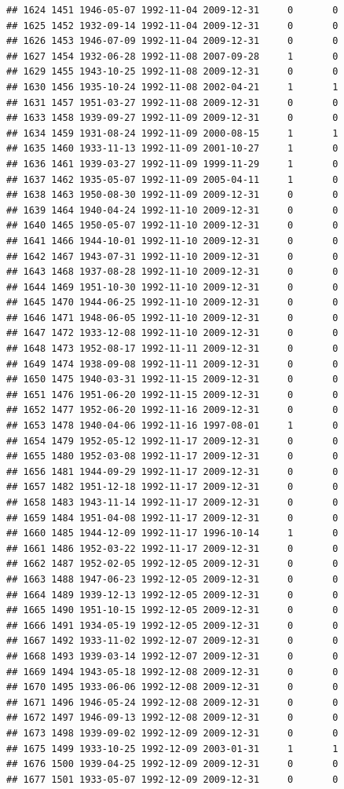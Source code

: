 \documentclass[
]{book}
\begin{document}
\begin{verbatim}
## 1624 1451 1946-05-07 1992-11-04 2009-12-31     0       0
## 1625 1452 1932-09-14 1992-11-04 2009-12-31     0       0
## 1626 1453 1946-07-09 1992-11-04 2009-12-31     0       0
## 1627 1454 1932-06-28 1992-11-08 2007-09-28     1       0
## 1629 1455 1943-10-25 1992-11-08 2009-12-31     0       0
## 1630 1456 1935-10-24 1992-11-08 2002-04-21     1       1
## 1631 1457 1951-03-27 1992-11-08 2009-12-31     0       0
## 1633 1458 1939-09-27 1992-11-09 2009-12-31     0       0
## 1634 1459 1931-08-24 1992-11-09 2000-08-15     1       1
## 1635 1460 1933-11-13 1992-11-09 2001-10-27     1       0
## 1636 1461 1939-03-27 1992-11-09 1999-11-29     1       0
## 1637 1462 1935-05-07 1992-11-09 2005-04-11     1       0
## 1638 1463 1950-08-30 1992-11-09 2009-12-31     0       0
## 1639 1464 1940-04-24 1992-11-10 2009-12-31     0       0
## 1640 1465 1950-05-07 1992-11-10 2009-12-31     0       0
## 1641 1466 1944-10-01 1992-11-10 2009-12-31     0       0
## 1642 1467 1943-07-31 1992-11-10 2009-12-31     0       0
## 1643 1468 1937-08-28 1992-11-10 2009-12-31     0       0
## 1644 1469 1951-10-30 1992-11-10 2009-12-31     0       0
## 1645 1470 1944-06-25 1992-11-10 2009-12-31     0       0
## 1646 1471 1948-06-05 1992-11-10 2009-12-31     0       0
## 1647 1472 1933-12-08 1992-11-10 2009-12-31     0       0
## 1648 1473 1952-08-17 1992-11-11 2009-12-31     0       0
## 1649 1474 1938-09-08 1992-11-11 2009-12-31     0       0
## 1650 1475 1940-03-31 1992-11-15 2009-12-31     0       0
## 1651 1476 1951-06-20 1992-11-15 2009-12-31     0       0
## 1652 1477 1952-06-20 1992-11-16 2009-12-31     0       0
## 1653 1478 1940-04-06 1992-11-16 1997-08-01     1       0
## 1654 1479 1952-05-12 1992-11-17 2009-12-31     0       0
## 1655 1480 1952-03-08 1992-11-17 2009-12-31     0       0
## 1656 1481 1944-09-29 1992-11-17 2009-12-31     0       0
## 1657 1482 1951-12-18 1992-11-17 2009-12-31     0       0
## 1658 1483 1943-11-14 1992-11-17 2009-12-31     0       0
## 1659 1484 1951-04-08 1992-11-17 2009-12-31     0       0
## 1660 1485 1944-12-09 1992-11-17 1996-10-14     1       0
## 1661 1486 1952-03-22 1992-11-17 2009-12-31     0       0
## 1662 1487 1952-02-05 1992-12-05 2009-12-31     0       0
## 1663 1488 1947-06-23 1992-12-05 2009-12-31     0       0
## 1664 1489 1939-12-13 1992-12-05 2009-12-31     0       0
## 1665 1490 1951-10-15 1992-12-05 2009-12-31     0       0
## 1666 1491 1934-05-19 1992-12-05 2009-12-31     0       0
## 1667 1492 1933-11-02 1992-12-07 2009-12-31     0       0
## 1668 1493 1939-03-14 1992-12-07 2009-12-31     0       0
## 1669 1494 1943-05-18 1992-12-08 2009-12-31     0       0
## 1670 1495 1933-06-06 1992-12-08 2009-12-31     0       0
## 1671 1496 1946-05-24 1992-12-08 2009-12-31     0       0
## 1672 1497 1946-09-13 1992-12-08 2009-12-31     0       0
## 1673 1498 1939-09-02 1992-12-09 2009-12-31     0       0
## 1675 1499 1933-10-25 1992-12-09 2003-01-31     1       1
## 1676 1500 1939-04-25 1992-12-09 2009-12-31     0       0
## 1677 1501 1933-05-07 1992-12-09 2009-12-31     0       0
\end{verbatim}
\end{document}
